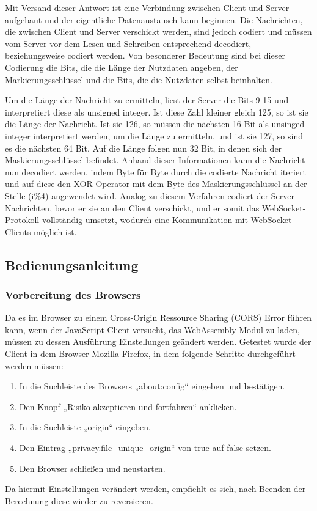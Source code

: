 \documentclass[12pt, onecolumn, notitlepage]{scrartcl}
\begin{document}
Mit Versand dieser Antwort ist eine Verbindung zwischen Client und Server aufgebaut und der eigentliche Datenaustausch kann beginnen. Die Nachrichten, die zwischen Client und Server verschickt werden, sind jedoch codiert und müssen vom Server vor dem Lesen und Schreiben entsprechend decodiert, beziehungsweise codiert werden. Von besonderer Bedeutung sind bei dieser Codierung die Bits, die die Länge der Nutzdaten angeben, der Markierungsschlüssel und die Bits, die die Nutzdaten selbst beinhalten. \par
Um die Länge der Nachricht zu ermitteln, liest der Server die Bits 9-15 und interpretiert diese als unsigned integer. Ist diese Zahl kleiner gleich 125, so ist sie die Länge der Nachricht. Ist sie 126, so müssen die nächsten 16 Bit als unsinged integer interpretiert werden, um die Länge zu ermitteln, und ist sie 127, so sind es die nächsten 64 Bit. Auf die Länge folgen nun 32 Bit, in denen sich der Maskierungsschlüssel befindet. Anhand dieser Informationen kann die Nachricht nun decodiert werden, indem Byte für Byte durch die codierte Nachricht iteriert und auf diese den XOR-Operator mit dem  Byte des Maskierungsschlüssel an der Stelle (i\%4) angewendet wird.  Analog zu diesem Verfahren codiert der Server Nachrichten, bevor er sie an den Client verschickt, und er somit das WebSocket-Protokoll vollständig umsetzt, wodurch eine Kommunikation mit WebSocket-Clients möglich ist.\\

\subsection{Bedienungsanleitung}
\subsubsection{Vorbereitung des Browsers}
Da es im Browser zu einem Cross-Origin Ressource Sharing (CORS) Error führen kann, wenn der JavaScript Client versucht, das WebAssembly-Modul zu laden, müssen zu dessen Ausführung Einstellungen geändert werden. Getestet wurde der Client in dem Browser Mozilla Firefox, in dem folgende Schritte durchgeführt werden müssen:
\begin{enumerate}
	\setlength\itemsep{0.07em}
	\item In die Suchleiste des Browsers „about:config“ eingeben und bestätigen.
	\item Den Knopf „Risiko akzeptieren und fortfahren“ anklicken.
	\item In die Suchleiste „origin“ eingeben.
	\item Den Eintrag „privacy.file\_unique\_origin“ von true auf false setzen.
	\item Den Browser schließen und neustarten.
\end{enumerate}
Da hiermit Einstellungen verändert werden, empfiehlt es sich, nach Beenden der Berechnung diese wieder zu reversieren.
\end{document}
